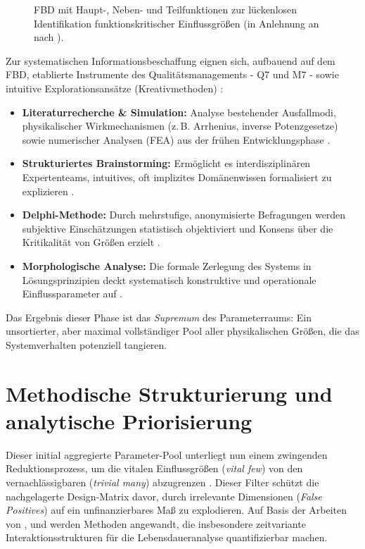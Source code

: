 \begin{figure}[htbp]
    \centering
    \def\svgwidth{0.95\textwidth}
    
    \caption{\ac{FBD} mit Haupt-, Neben- und Teilfunktionen zur lückenlosen Identifikation funktionskritischer Einflussgrößen (in Anlehnung an \cite{Arndt.2023c} nach \cite{Wallace.2007}).}
    \label{fig:fbd_structure}
\end{figure}

Zur systematischen Informationsbeschaffung eignen sich, aufbauend auf dem \ac{FBD}, etablierte Instrumente des Qualitätsmanagements - \ac{Q7} und \ac{M7} - sowie intuitive Explorationsansätze (Kreativmethoden) \cite{Montgomery.2020b,Bruckner.2019}:
\begin{itemize}
    \item \textbf{Literaturrecherche \& Simulation:} Analyse bestehender Ausfallmodi, physikalischer Wirkmechanismen (z.\,B. Arrhenius, inverse Potenzgesetze) sowie numerischer Analysen (\ac{FEA}) aus der frühen Entwicklungsphase \cite{Breiing.1997}.
    \item \textbf{Strukturiertes Brainstorming:} Ermöglicht es interdisziplinären Ex\-perten\-teams, intuitives, oft implizites Domänenwissen formalisiert zu explizieren \cite{Daenzer.2002,Mayers.1997}.
    \item \textbf{Delphi-Methode:} Durch mehrstufige, anonymisierte Befragungen werden subjektive Einschätzungen statistisch objektiviert und Konsens über die Kritikalität von Größen erzielt \cite{Daenzer.2002}.
    \item \textbf{Morphologische Analyse:} Die formale Zerlegung des Systems in Lösungsprinzipien deckt systematisch konstruktive und operationale Einflussparameter auf \cite{Albers.2005,Thompson.1999}.
\end{itemize}
Das Ergebnis dieser Phase ist das \textit{Supremum} des Parameterraums: Ein unsortierter, aber maximal vollständiger Pool aller physikalischen Größen, die das Systemverhalten potenziell tangieren.

\section{Methodische Strukturierung und analytische Priorisierung} \label{sec:screening_kreativ}

Dieser initial aggregierte Parameter-Pool unterliegt nun einem zwingenden Reduktionsprozess, um die vitalen Einflussgrößen (\textit{vital few}) von den vernachlässigbaren (\textit{trivial many}) abzugrenzen \cite{Arndt.2023c}.
Dieser Filter schützt die nachgelagerte Design-Matrix davor, durch irrelevante Dimensionen (\textit{False Positives}) auf ein unfinanzierbares Maß zu explodieren.
Auf Basis der Arbeiten von \textcite{Gundlach.2004}, \textcite{Kremer.2018b} und \textcite{Mayers.1997} werden Methoden angewandt, die insbesondere zeitvariante Interaktionsstrukturen für die Lebensdaueranalyse quantifizierbar machen.

